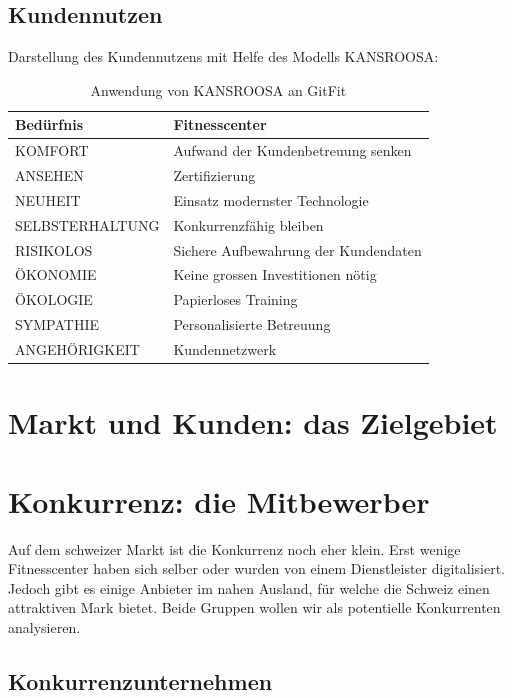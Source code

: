 \subsection{Kundennutzen}
Darstellung des Kundennutzens mit Helfe des Modells KANSROOSA:
\begin{table}[h]
	\centering
	\begin{tabu} to \linewidth {l l}
		\toprule 
		Bedürfnis & Fitnesscenter \\
		\midrule
		KOMFORT & Aufwand der Kundenbetreuung senken \\
		ANSEHEN & Zertifizierung \\
		NEUHEIT & Einsatz modernster Technologie \\
		SELBSTERHALTUNG & Konkurrenzfähig bleiben \\
		RISIKOLOS & Sichere Aufbewahrung der Kundendaten \\
		ÖKONOMIE & Keine grossen Investitionen nötig \\
		ÖKOLOGIE & Papierloses Training \\
		SYMPATHIE & Personalisierte Betreuung \\
		ANGEHÖRIGKEIT & Kundennetzwerk \\
		\bottomrule 
	\end{tabu} 
	\caption{Anwendung von KANSROOSA an GitFit}
\end{table}

\section{Markt und Kunden: das Zielgebiet}
\section{Konkurrenz: die Mitbewerber}
Auf dem schweizer Markt ist die Konkurrenz noch eher klein. Erst wenige Fitnesscenter haben sich selber oder wurden von einem Dienstleister digitalisiert. Jedoch gibt es einige Anbieter im nahen Ausland, für welche die Schweiz einen attraktiven Mark bietet. Beide Gruppen wollen wir als potentielle Konkurrenten analysieren.
\subsection{Konkurrenzunternehmen}
